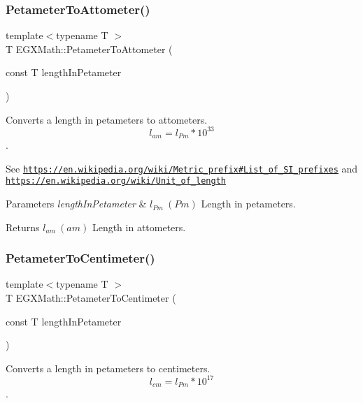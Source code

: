 \subsubsection{\texorpdfstring{Petameter\+To\+Attometer()}{PetameterToAttometer()}}
{\footnotesize\ttfamily template$<$typename T $>$ \\
T E\+G\+X\+Math\+::\+Petameter\+To\+Attometer (\begin{DoxyParamCaption}\item[{const T}]{length\+In\+Petameter }\end{DoxyParamCaption})}



Converts a length in petameters to attometers. \[ l_{am}=l_{Pm} * 10^{33} \]. 

See \href{https://en.wikipedia.org/wiki/Metric_prefix#List_of_SI_prefixes}{\tt https\+://en.\+wikipedia.\+org/wiki/\+Metric\+\_\+prefix\#\+List\+\_\+of\+\_\+\+S\+I\+\_\+prefixes} and \href{https://en.wikipedia.org/wiki/Unit_of_length}{\tt https\+://en.\+wikipedia.\+org/wiki/\+Unit\+\_\+of\+\_\+length} 
\begin{DoxyParams}{Parameters}
{\em length\+In\+Petameter} & $ l_{Pm}\ (Pm)$ Length in petameters. \\
\hline
\end{DoxyParams}
\begin{DoxyReturn}{Returns}
$ l_{am}\ (am)$ Length in attometers. 
\end{DoxyReturn}
\mbox{\label{group___e_g_x_math-_conversions-_length_conversions-_petameter-_s_i_ga68b8b99b5e0f36fee33e5f0d0dea3f2b}} 
\subsubsection{\texorpdfstring{Petameter\+To\+Centimeter()}{PetameterToCentimeter()}}
{\footnotesize\ttfamily template$<$typename T $>$ \\
T E\+G\+X\+Math\+::\+Petameter\+To\+Centimeter (\begin{DoxyParamCaption}\item[{const T}]{length\+In\+Petameter }\end{DoxyParamCaption})}



Converts a length in petameters to centimeters. \[ l_{cm}=l_{Pm} * 10^{17} \]. 

